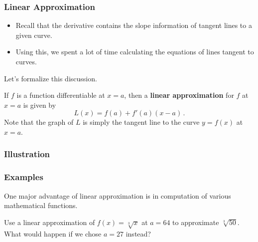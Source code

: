\documentclass[10pt,t,handout,ignorenonframetext,aspectratio=169]{beamer}
\title[\course]{\lecTitle}
\institute[Ohio State]
{
  \medskip
}
\date[\week]{\semester}
\author{Tae Eun Kim, Ph.D.}
\begin{document}
\begin{frame}
  \titlepage
\end{frame}

\begin{frame}
  \frametitle{Linear Approximation}

  \begin{itemize}
  \item Recall that the derivative contains the slope information of
    tangent lines to a given curve.
  \item Using this, we spent a lot of time calculating the equations
    of lines tangent to curves.
  \end{itemize}
  Let's formalize this discussion.

  \begin{defn}
    If $f$ is a function differentiable at $x=a$, then a \textbf{linear
      approximation} for $f$ at $x=a$ is given by
    \[
      L(x) = f(a) + f'(a) (x-a) \,.
    \]
    Note that the graph of $L$ is simply the tangent line to the curve
    $y = f(x)$ at $x=a$.
  \end{defn}
\end{frame}

\begin{frame}
  \frametitle{Illustration}
  \begin{image}
  \end{image}
\end{frame}


\begin{frame}
  \frametitle{Examples}
  One major advantage of linear approximation is in computation of
  various mathematical functions.
  \vs{}

  \question{} Use a linear approximation of $f(x) =\sqrt[3]{x}$ at
  $a=64$ to approximate $\sqrt[3]{50}$. What would happen if we chose
  $a=27$ instead?
\end{frame}
\end{document}
